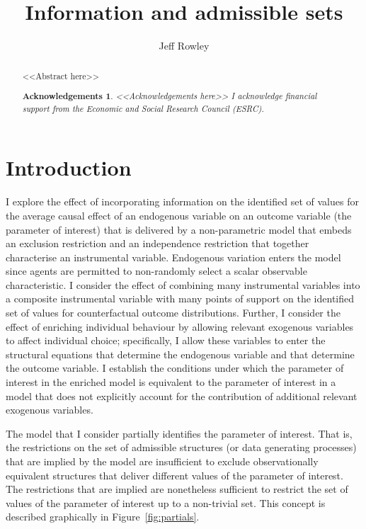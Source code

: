 \documentclass[10pt,a4paper,twoside]{article}
\title{Information and admissible sets}
\author{Jeff Rowley}
\newtheorem*{Acknowledgements}{Acknowledgements}
\numberwithin{equation}{subsection}
\newcommand{\ESRC}{I acknowledge financial support from the Economic and Social Research Council (ESRC).}
\begin{document}
\maketitle
\vspace{10mm}
\begin{abstract}
\noindent <<Abstract here>>
\begin{Acknowledgements}
<<Acknowledgements here>>
\ESRC
\end{Acknowledgements}
\end{abstract}
\vspace{5mm}
\section{Introduction}
I explore the effect of incorporating information on the identified set of values for the average causal effect of an endogenous variable on an outcome variable (the parameter of interest) that is delivered by a non-parametric model that embeds an exclusion restriction and an independence restriction that together characterise an instrumental variable. Endogenous variation enters the model since agents are permitted to non-randomly select a scalar observable characteristic. I consider the effect of combining many instrumental variables into a composite instrumental variable with many points of support on the identified set of values for counterfactual outcome distributions. Further, I consider the effect of enriching individual behaviour by allowing relevant exogenous variables to affect individual choice; specifically, I allow these variables to enter the structural equations that determine the endogenous variable and that determine the outcome variable. I establish the conditions under which the parameter of interest in the enriched model is equivalent to the parameter of interest in a model that does not explicitly account for the contribution of additional relevant exogenous variables. 

The model that I consider partially identifies the parameter of interest. That is, the restrictions on the set of admissible structures (or data generating processes) that are implied by the model are insufficient to exclude observationally equivalent structures that deliver different values of the parameter of interest. The restrictions that are implied are nonetheless sufficient to restrict the set of values of the parameter of interest up to a non-trivial set. This concept is described graphically in Figure~\ref{fig:partials}. 
\end{document}
